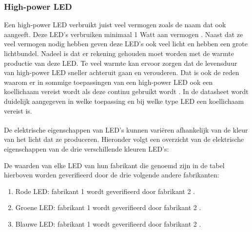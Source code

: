 \subsubsection{High-power LED}
Een high-power LED verbruikt juist veel vermogen zoals de naam dat ook aangeeft. Deze LED's 
verbruiken minimaal 1 Watt aan vermogen \cite{FarnellDatasheet}. 
Naast dat ze veel vermogen nodig hebben geven deze LED's ook veel licht en hebben een grote lichtbundel. 
Nadeel is dat er rekening gehouden moet worden met de warmte productie van deze LED. 
Te veel warmte kan ervoor zorgen dat de levensduur van high-power LED sneller achteruit gaan en verouderen. 
Dat is ook de reden waarom er in sommige toepassingen van een high-power LED ook een koellichaam vereist wordt als deze continu gebruikt wordt \cite{LEDSupply}. 
In de datasheet wordt duidelijk aangegeven in welke toepassing en bij welke type LED een koellichaam vereist is. 
\\
\\
De elektrische eigenschappen van LED's kunnen variëren afhankelijk van de kleur van het licht dat ze produceren. 
Hieronder volgt een overzicht van de elektrische eigenschappen van de drie verschillende kleuren LED's:
\begin{table}[h]
    \centering    
    \caption{LED eigenschappen van de drie primaire kleuren.}
    \label{table:LEDs}
    \end{table}

De waarden van elke LED van hun fabrikant die genoemd zijn in de tabel hierboven worden geverifieerd door de drie volgende andere fabrikanten:
\begin{enumerate}
    \item Rode LED: fabrikant 1 \cite{redLED1} wordt geverifieerd door fabrikant 2 \cite{redLED2}.
    \item Groene LED: fabrikant 1 \cite{greenLED1} wordt geverifieerd door fabrikant 2 \cite{greenLED2}.
    \item Blauwe LED: fabrikant 1 \cite{blueLED1} wordt geverifieerd door fabrikant 2 \cite{blueLED2}.
\end{enumerate}

